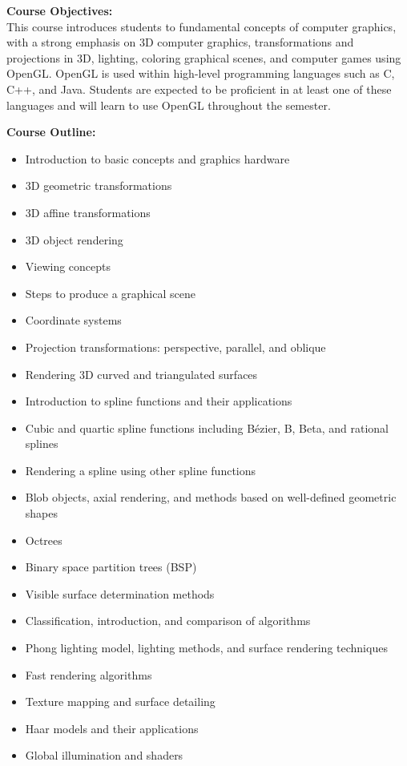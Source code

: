 \documentclass[12pt]{article}
\begin{document}
\textbf{Course Objectives:} \\
This course introduces students to fundamental concepts of computer graphics, with a strong emphasis on 3D computer graphics, transformations and projections in 3D, lighting, coloring graphical scenes, and computer games using OpenGL. OpenGL is used within high-level programming languages such as C, C++, and Java. Students are expected to be proficient in at least one of these languages and will learn to use OpenGL throughout the semester.

\textbf{Course Outline:}
\begin{itemize}
    \item Introduction to basic concepts and graphics hardware
    \item 3D geometric transformations
    \item 3D affine transformations
    \item 3D object rendering
    \item Viewing concepts
    \item Steps to produce a graphical scene
    \item Coordinate systems
    \item Projection transformations: perspective, parallel, and oblique
    \item Rendering 3D curved and triangulated surfaces
    \item Introduction to spline functions and their applications
    \item Cubic and quartic spline functions including Bézier, B, Beta, and rational splines
    \item Rendering a spline using other spline functions
    \item Blob objects, axial rendering, and methods based on well-defined geometric shapes
    \item Octrees
    \item Binary space partition trees (BSP)
    \item Visible surface determination methods
    \item Classification, introduction, and comparison of algorithms
    \item Phong lighting model, lighting methods, and surface rendering techniques
    \item Fast rendering algorithms
    \item Texture mapping and surface detailing
    \item Haar models and their applications
    \item Global illumination and shaders

\end{itemize}
\end{document}
